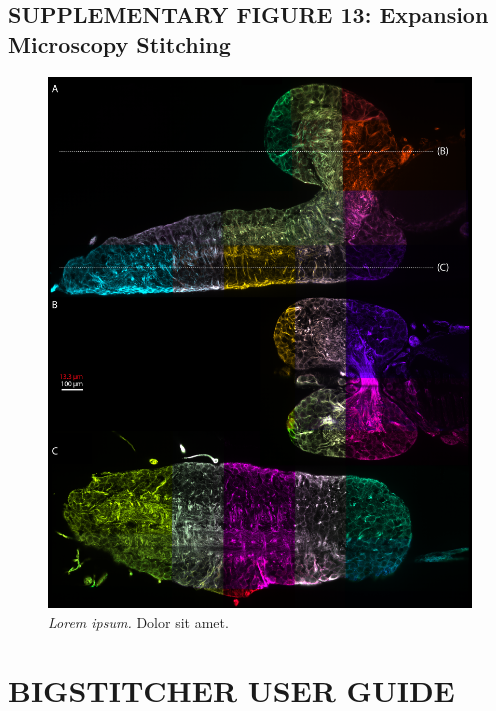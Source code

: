 \documentclass[]{spie}  %
\begin{document}
\subsection*{SUPPLEMENTARY FIGURE 13: Expansion Microscopy Stitching}
\vspace{1mm}
\begin{figure}[h!]
\includegraphics[width=\textwidth]{fig-expansion_tiling.png}
\vspace{-2.0mm}
\caption{\hspace{-0.5mm} \emph{Lorem ipsum.} Dolor sit amet.
}
\label{fig:sup-fig-link-explorer}
\end{figure}

\pagebreak



\section{BIGSTITCHER USER GUIDE}
\label{sec:documentation}


\end{document}
